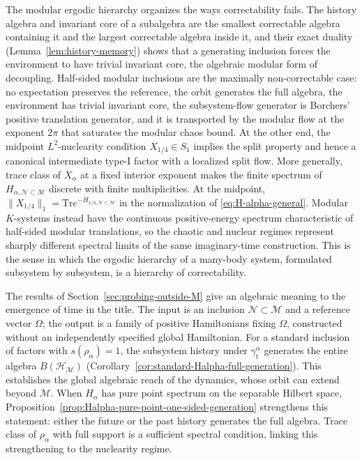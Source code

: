 \documentclass[a4paper,11pt]{article}
\theoremstyle{definition}
\newcommand{\Tr}{\text{Tr}}
\newcommand{\mN}{\mathcal{N}}
\newcommand{\mH}{\mathcal{H}}
\newcommand{\mM}{\mathcal{M}}
\begin{document}
The modular ergodic hierarchy organizes the ways correctability fails. The history algebra and invariant core of a subalgebra are the smallest correctable algebra containing it and the largest correctable algebra inside it, and their exact duality (Lemma~\ref{lem:history-memory}) shows that a generating inclusion forces the environment to have trivial invariant core, the algebraic modular form of decoupling. Half-sided modular inclusions are the maximally non-correctable case: no expectation preserves the reference, the orbit generates the full algebra, the environment has trivial invariant core, the subsystem-flow generator is Borchers' positive translation generator, and it is transported by the modular flow at the exponent $2\pi$ that saturates the modular chaos bound. At the other end, the midpoint $L^2$-nuclearity condition $X_{1/4}\in S_1$ implies the split property and hence a canonical intermediate type-I factor with a localized split flow. More generally, trace class of $X_\alpha$ at a fixed interior exponent makes the finite spectrum of $H_{\alpha,\mN\subset\mM}$ discrete with finite multiplicities. At the midpoint, $\|X_{1/4}\|_1=\Tr e^{-H_{1/4,\mN\subset\mM}}$ in the normalization of \eqref{eq:H-alpha-general}. Modular $K$-systems instead have the continuous positive-energy spectrum characteristic of half-sided modular translations, so the chaotic and nuclear regimes represent sharply different spectral limits of the same imaginary-time construction. This is the sense in which the ergodic hierarchy of a many-body system, formulated subsystem by subsystem, is a hierarchy of correctability.

The results of Section~\ref{sec:probing-outside-M} give an algebraic meaning to the emergence of time in the title. The input is an inclusion $\mN\subset\mM$ and a reference vector $\Omega$; the output is a family of positive Hamiltonians fixing $\Omega$, constructed without an independently specified global Hamiltonian. For a standard inclusion of factors with $s(\rho_\alpha)=1$, the subsystem history under $\gamma_t^\alpha$ generates the entire algebra $B(\mH_{\mM})$ (Corollary~\ref{cor:standard-Halpha-full-generation}). This establishes the global algebraic reach of the dynamics, whose orbit can extend beyond $\mM$. When $H_\alpha$ has pure point spectrum on the separable Hilbert space, Proposition~\ref{prop:Halpha-pure-point-one-sided-generation} strengthens this statement: either the future or the past history generates the full algebra. Trace class of $\rho_\alpha$ with full support is a sufficient spectral condition, linking this strengthening to the nuclearity regime.
\end{document}
